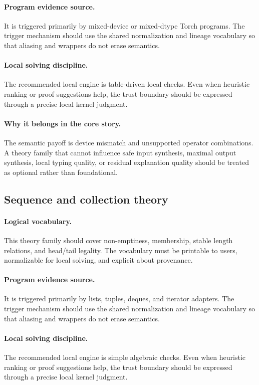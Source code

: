 \documentclass[11pt]{report}
\theoremstyle{definition}
\theoremstyle{plain}
\begin{document}
\paragraph{Program evidence source.}
It is triggered primarily by mixed-device or mixed-dtype Torch programs. The trigger mechanism should use the
shared normalization and lineage vocabulary so that aliasing and wrappers do
not erase semantics.

\paragraph{Local solving discipline.}
The recommended local engine is table-driven local checks. Even when heuristic ranking or
proof suggestions help, the trust boundary should be expressed through a
precise local kernel judgment.

\paragraph{Why it belongs in the core story.}
The semantic payoff is device mismatch and unsupported operator combinations. A theory family that cannot influence safe
input synthesis, maximal output synthesis, local typing quality, or residual
explanation quality should be treated as optional rather than foundational.

\subsection{Sequence and collection theory}

\paragraph{Logical vocabulary.}
This theory family should cover non-emptiness, membership, stable length relations, and head/tail legality. The vocabulary must be printable to
users, normalizable for local solving, and explicit about provenance.

\paragraph{Program evidence source.}
It is triggered primarily by lists, tuples, deques, and iterator adapters. The trigger mechanism should use the
shared normalization and lineage vocabulary so that aliasing and wrappers do
not erase semantics.

\paragraph{Local solving discipline.}
The recommended local engine is simple algebraic checks. Even when heuristic ranking or
proof suggestions help, the trust boundary should be expressed through a
precise local kernel judgment.
\end{document}
